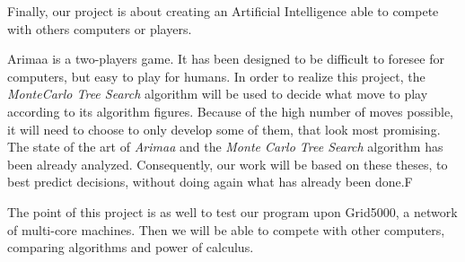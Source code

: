 
Finally, our project is about creating an Artificial Intelligence able to compete with others computers or players.
\newline

Arimaa is a two-players game. It has been designed to be difficult to foresee for computers, but easy to play for humans. 
In order to realize this project, the \emph{MonteCarlo Tree Search} algorithm will be used to decide what move to play according to its algorithm figures. Because of the high number of moves possible, it will need to choose to only develop some of them, that look most promising.
The state of the art of \emph{Arimaa} and the \emph{Monte Carlo Tree Search} algorithm has been already analyzed. Consequently, our work will be based on these theses, to best predict decisions, without doing again what has already been done.F
\newline

The point of this project is as well to test our program upon Grid5000, a network of multi-core machines. Then we will be able to compete with other computers, comparing algorithms and power of calculus.